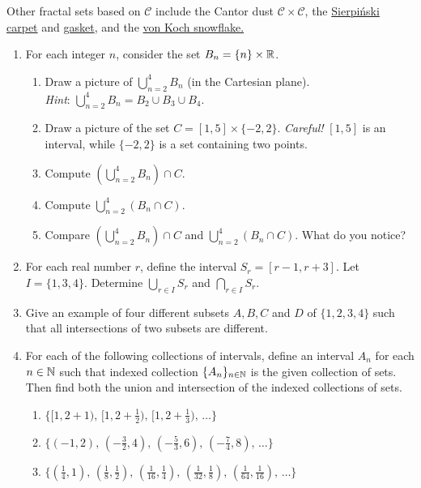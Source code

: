 Other fractal sets based on $\mathcal C$ include the Cantor dust $\mathcal C\times\mathcal C$, the \href{http://en.wikipedia.org/wiki/Sierpinski_carpet}{Sierpi\'nski carpet} and \href{http://en.wikipedia.org/wiki/Sierpinski_triangle}{gasket}, and the \href{http://en.wikipedia.org/wiki/Koch_snowflake}{von Koch snowflake.}




\begin{exercises}{}{}
\begin{enumerate}
  	\item For each integer $n$, consider the set $B_n=\{n\}\times\mathbb{R}$.
	\begin{enumerate}
		\item Draw a picture of $\bigcup\limits_{n=2}^4B_n$ (in the Cartesian plane).\\
		\emph{Hint}:  $\bigcup \limits_{n=2}^{4} B_n= B_2 \cup B_3 \cup B_4.$
		\item Draw a picture of the set $C=[1,5]\times\{-2,2\}.$
		\emph{Careful!} $[1,5]$ is an interval, while $\{-2,2\}$ is a set containing two points.
		\item Compute $\left(\bigcup\limits_{n=2}^4B_n\right)\cap C$.
		\item Compute $\bigcup\limits_{n=2}^4\left(B_n\cap C\right)$.
		\item Compare $\left(\bigcup\limits_{n=2}^4B_n\right)\cap C$ and $\bigcup\limits_{n=2}^4\left(B_n\cap C\right)$. What do you notice?
	\end{enumerate}

  \item For each real number $r$, define the interval $S_r=[r-1,r+3]$. Let $I=\{1,3,4\}$. Determine $\bigcup\limits_{r\in I}S_r$ and $\bigcap\limits_{r\in I}S_r$.


  \item Give an example of four different subsets $A,B,C$ and $D$ of $\{1,2,3,4\}$ such that all intersections of two subsets are different.

  \item For each of the following collections of intervals, define an interval $A_n$ for each $n\in\mathbb{N}$ such that indexed collection $\{A_n\}_{n\in\mathbb{N}}$ is the given collection of sets. Then find both the union and intersection of the indexed collections of sets.
   \begin{enumerate}
     \item $\big\{[1,2+1),\,[1,2+\frac 12),\,[1,2+\frac 13),\,\ldots\big\}$
     \item $\big\{(-1,2),\,(-\frac 32,4),\,(-\frac 53,6),\,(-\frac 74,8),\,\ldots\big\}$
     \item $\big\{(\frac 14,1),\,(\frac 18,\frac 12),\,(\frac 1{16},\frac 14),\,(\frac 1{32},\frac 18), \,(\frac 1{64},\frac 1{16}),\,\ldots\big\}$
   \end{enumerate}
  

\end{enumerate}
\end{exercises}
